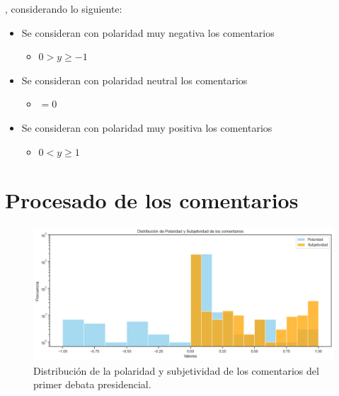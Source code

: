 \cite{quiroga2016}, considerando lo siguiente:

\begin{itemize}
	\item Se consideran con polaridad muy negativa los comentarios 
	\begin{itemize}
		\item $0> y \geq-1 $
	\end{itemize}
	\item Se consideran con polaridad neutral los comentarios 
	\begin{itemize}
		\item $= 0 $
	\end{itemize}
		\item Se consideran con polaridad muy positiva los comentarios 
	\begin{itemize}
		\item $0< y  \geq 1 $
	\end{itemize}
\end{itemize}



\chapter{Procesado de los comentarios}

\begin{figure}[!h]
	\centering
	\includegraphics[width=16cm]{../Datos/polaridadYsubjetividad}
	\caption[Distribución de polaridad y subjetividad]{Distribución de la polaridad y subjetividad de los comentarios del primer debata presidencial.}
	\label{fig:dpys}
\end{figure}


